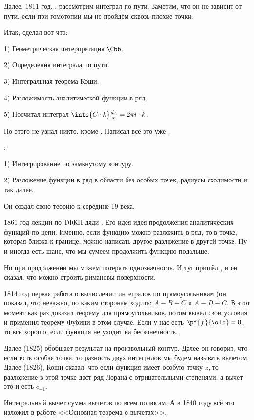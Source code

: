 \documentclass[a4paper,oneside,fleqn,10pt]{article}
\begin{document}
Далее, 1811 год.  : рассмотрим
интеграл по пути.  Заметим, что он не зависит от пути, если при
гомотопии мы не пройдём сквозь плохие точки.

Итак,  сделал вот что:

1) Геометрическая интерпретация $\Cbb$.

2) Определения интеграла по пути.

3) Интегральная теорема Коши.

4) Разложимость аналитической функции в ряд.

5) Посчитал интеграл $\ints{C\cdot k} \frac{dx}{x} = 2\pi i \cdot k$.

Но этого не узнал никто, кроме . Написал всё
это уже .

:

1) Интегрирование по замкнутому контуру.

2) Разложение функции в ряд в области без особых точек, радиусы
сходимости и так далее.

Он создал свою теорию к середине 19 века.

1861 год лекции по ТФКП дяди . Его
идея идея продолжения аналитических функций по цепи.  Именно, если
функцию можно разложить в ряд, то в точке, которая близка к границе,
можно написать другое разложение в другой точке. Ну и иногда есть
шанс, что мы сумеем продолжить функцию подальше.

Но при продолжении мы можем потерять однозначность. И тут пришёл
, и он сказал, что можно строить римановы поверхности.

1814 год первая работа  о вычислении интегралов по
прямоугольникам (он показал, что неважно, по каким сторонам ходить:
$A{-}B{-}C$ и $A{-}D{-}C$.  В этот момент  как раз доказал
теорему  для прямоугольников, потом  вывел
свои условия и применил теорему Фубини в этом случае. Если у нас есть
$\pf{f}{\ol z} = 0$, то всё хорошо, если функция не уходит на
бесконечность.

Далее (1825)  обобщает результат на произвольный
контур. Далее он говорит, что если есть особая точка, то разность двух
интегралов мы будем называть вычетом. Далее (1826), Коши сказал, что
если функция имеет особую точку $z$, то разложение в этой точке даст
ряд Лорана с отрицательными степенями, а вычет это и есть $c_{-1}$.

Интегральный вычет сумма вычетов по всем полюсам. А в 1840 году
 всё это изложил в работе <<Основная теорема о вычетах>>.
\end{document}
